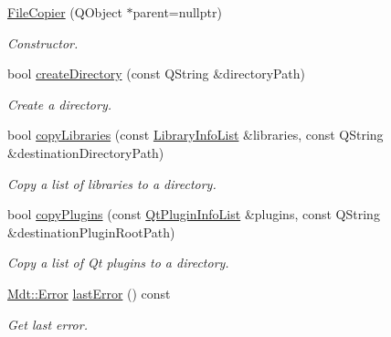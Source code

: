 \begin{DoxyCompactItemize}
\item 
\hyperlink{class_mdt_1_1_deploy_utils_1_1_file_copier_af21c6f7e6fc3074e2fed28d127b29edf}{File\+Copier} (Q\+Object $\ast$parent=nullptr)\hypertarget{class_mdt_1_1_deploy_utils_1_1_file_copier_af21c6f7e6fc3074e2fed28d127b29edf}{}\label{class_mdt_1_1_deploy_utils_1_1_file_copier_af21c6f7e6fc3074e2fed28d127b29edf}

\begin{DoxyCompactList}\small\item\em Constructor. \end{DoxyCompactList}\item 
bool \hyperlink{class_mdt_1_1_deploy_utils_1_1_file_copier_ab1040ccbe34149841a42191e7ced3ba4}{create\+Directory} (const Q\+String \&directory\+Path)
\begin{DoxyCompactList}\small\item\em Create a directory. \end{DoxyCompactList}\item 
bool \hyperlink{class_mdt_1_1_deploy_utils_1_1_file_copier_ab81974d2e6e5b2260a8147c3400dcb3a}{copy\+Libraries} (const \hyperlink{class_mdt_1_1_deploy_utils_1_1_library_info_list}{Library\+Info\+List} \&libraries, const Q\+String \&destination\+Directory\+Path)
\begin{DoxyCompactList}\small\item\em Copy a list of libraries to a directory. \end{DoxyCompactList}\item 
bool \hyperlink{class_mdt_1_1_deploy_utils_1_1_file_copier_a94de86a0ecb039e8c01deb715d09722e}{copy\+Plugins} (const \hyperlink{class_mdt_1_1_deploy_utils_1_1_qt_plugin_info_list}{Qt\+Plugin\+Info\+List} \&plugins, const Q\+String \&destination\+Plugin\+Root\+Path)
\begin{DoxyCompactList}\small\item\em Copy a list of Qt plugins to a directory. \end{DoxyCompactList}\item 
\hyperlink{class_mdt_1_1_error}{Mdt\+::\+Error} \hyperlink{class_mdt_1_1_deploy_utils_1_1_file_copier_a8e82df0b666b0cdb45edd878af31893f}{last\+Error} () const \hypertarget{class_mdt_1_1_deploy_utils_1_1_file_copier_a8e82df0b666b0cdb45edd878af31893f}{}\label{class_mdt_1_1_deploy_utils_1_1_file_copier_a8e82df0b666b0cdb45edd878af31893f}

\begin{DoxyCompactList}\small\item\em Get last error. \end{DoxyCompactList}\end{DoxyCompactItemize}


